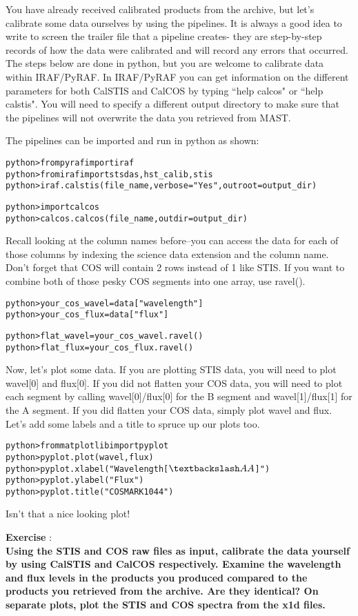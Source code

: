 You have already received calibrated products from the archive, but let's calibrate some data ourselves by using the pipelines.  It is always a good idea to write to screen the trailer file that a pipeline creates- they are step-by-step records of how the data were calibrated and will record any errors that occurred. The steps below are done in python, but you are welcome to calibrate data within IRAF/PyRAF. In IRAF/PyRAF you can get information on the different parameters for both CalSTIS and CalCOS by typing ``help calcos" or ``help calstis". You will need to specify a different output directory to make sure that the pipelines will not overwrite the data you retrieved from MAST.

The pipelines can be imported and run in python as shown:
\begin{alltt}
python> from pyraf import iraf
python> from iraf import stsdas, hst_calib, stis
python> iraf.calstis(file_name, verbose = "Yes", outroot=output_dir)

python> import calcos
python> calcos.calcos(file_name, outdir=output_dir)
\end{alltt}
Recall looking at the column names before--you can access the data for each of those columns by indexing the science data extension and the column name. Don't forget that COS will contain 2 rows instead of 1 like STIS. If you want to combine both of those pesky COS segments into one array, use ravel(). 
\begin{alltt}
python> your_cos_wavel = data["wavelength"]
python> your_cos_flux = data["flux"]

python> flat_wavel = your_cos_wavel.ravel()
python> flat_flux = your_cos_flux.ravel()
\end{alltt}
Now, let's plot some data. If you are plotting STIS data, you will need to plot wavel[0] and flux[0]. If you did not flatten your COS data, you will need to plot each segment by calling wavel[0]/flux[0] for the B segment and wavel[1]/flux[1] for the A segment. If you did flatten your COS data, simply plot wavel and flux. Let's add some labels and a title to spruce up our plots too.
\begin{alltt}
python> from matplotlib import pyplot
python> pyplot.plot(wavel, flux)
python> pyplot.xlabel("Wavelength [$\textbackslash AA$]")
python> pyplot.ylabel("Flux")
python> pyplot.title("COS MARK1044")
\end{alltt}
Isn't that a nice looking plot!

{\bf \color{blue} Exercise  }:  \\
{\bf Using the STIS and COS raw files as input, calibrate the data yourself by using CalSTIS and CalCOS respectively. Examine the wavelength and flux levels in the products you produced compared to the products you retrieved from the archive. Are they identical? On separate plots, plot the STIS and COS spectra from the x1d files.}

